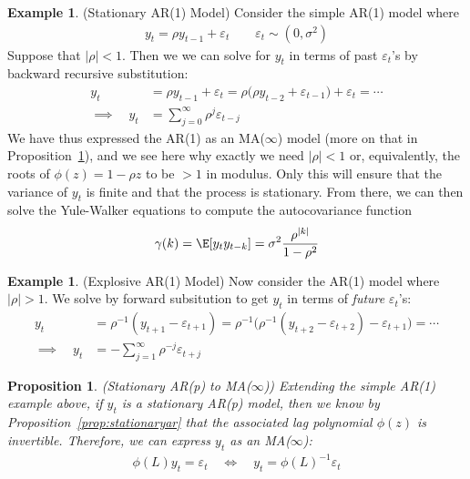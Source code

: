 \documentclass[12pt]{article}
\theoremstyle{plain}
\newtheorem{prop}[thm]{Proposition}
\theoremstyle{definition}
\newtheorem{ex}[thm]{Example}
\theoremstyle{remark}
\begin{document}
\begin{ex}(Stationary AR(1) Model)
Consider the simple AR(1) model where
\begin{align*}
  y_t = \rho y_{t-1} + \varepsilon_t
  \qquad \varepsilon_t\sim(0,\sigma^2)
\end{align*}
Suppose that $|\rho|<1$. Then we we can solve for $y_t$ in terms of past
$\varepsilon_t$'s by backward recursive substitution:
\begin{align*}
  y_t
  &= \rho y_{t-1} + \varepsilon_t
  = \rho\big(\rho y_{t-2} + \varepsilon_{t-1}\big) + \varepsilon_t
  = \cdots \\
  \implies\quad
  y_t
  &=
  \sum_{j=0}^\infty \rho^j\varepsilon_{t-j}
\end{align*}
We have thus expressed the AR(1) as an MA($\infty$) model (more on that
in Proposition~\ref{prop:artoma}), and we see here why exactly we need
$|\rho|<1$ or, equivalently, the roots of $\phi(z) = 1-\rho z$ to be
$>1$ in modulus. Only this will ensure that the variance of $y_t$ is
finite and that the process is stationary.  From there, we can then
solve the Yule-Walker equations to compute the autocovariance function
\begin{align*}
  \gamma(k) = \E[y_ty_{t-k}] = \sigma^2 \frac{\rho^{|k|}}{1-\rho^2}
\end{align*}
\end{ex}

\begin{ex}(Explosive AR(1) Model)
Now consider the AR(1) model where $|\rho|>1$. We solve by forward
subsitution to get $y_t$ in terms of \emph{future} $\varepsilon_t$'s:
\begin{align*}
  y_t
  &= \rho^{-1}(y_{t+1} - \varepsilon_{t+1})
  = \rho^{-1}\big(
      \rho^{-1}(y_{t+2} - \varepsilon_{t+2}) - \varepsilon_{t+1}\big)
  = \cdots \\
  \implies\quad
  y_t
  &=
  -\sum_{j=1}^\infty \rho^{-j}\varepsilon_{t+j}
\end{align*}
\end{ex}

\begin{prop}\emph{(Stationary AR(p) to MA($\infty$))}
\label{prop:artoma}
Extending the simple AR(1) example above, if $y_t$ is a stationary AR(p)
model, then we know by Proposition~\ref{prop:stationaryar} that the
associated lag polynomial $\phi(z)$ is invertible. Therefore, we can
express $y_t$ as an MA($\infty$):
\begin{align*}
  \phi(L)y_t = \varepsilon_t
  \quad\iff\quad
  y_t = \phi(L)^{-1}\varepsilon_t
\end{align*}
\end{prop}
\end{document}
